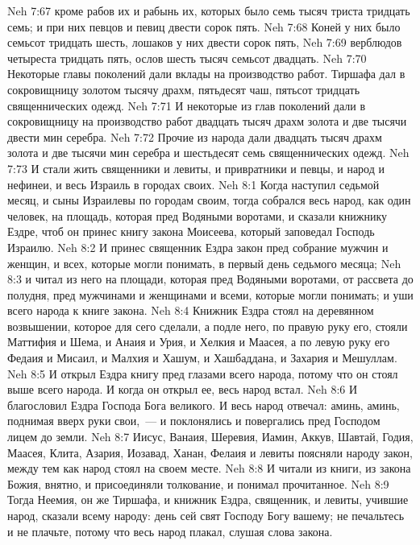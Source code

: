 \vs Neh 7:67 кроме рабов их и рабынь их, которых было семь тысяч триста тридцать семь; и при них певцов и певиц двести сорок пять.
\vs Neh 7:68 Коней у них было семьсот тридцать шесть, лошаков у них двести сорок пять,
\vs Neh 7:69 верблюдов четыреста тридцать пять, ослов шесть тысяч семьсот двадцать.
\vs Neh 7:70 Некоторые главы поколений дали вклады на производство работ. Тиршафа дал в сокровищницу золотом тысячу драхм, пятьдесят чаш, пятьсот тридцать священнических одежд.
\vs Neh 7:71 И некоторые из глав поколений дали в сокровищницу на производство работ двадцать тысяч драхм золота и две тысячи двести мин серебра.
\vs Neh 7:72 Прочие из народа дали двадцать тысяч драхм золота и две тысячи мин серебра и шестьдесят семь священнических одежд.
\vs Neh 7:73 И стали жить священники и левиты, и привратники и певцы, и народ и нефинеи, и весь Израиль в городах своих.
\vs Neh 8:1 Когда наступил седьмой месяц, и сыны Израилевы  по городам своим, тогда собрался весь народ, как один человек, на площадь, которая пред Водяными воротами, и сказали книжнику Ездре, чтоб он принес книгу закона Моисеева, который заповедал Господь Израилю.
\vs Neh 8:2 И принес священник Ездра закон пред собрание мужчин и женщин, и всех, которые могли понимать, в первый день седьмого месяца;
\vs Neh 8:3 и читал из него на площади, которая пред Водяными воротами, от рассвета до полудня, пред мужчинами и женщинами и всеми, которые могли понимать; и уши всего народа  к книге закона.
\vs Neh 8:4 Книжник Ездра стоял на деревянном возвышении, которое для сего сделали, а подле него, по правую руку его, стояли Маттифия и Шема, и Анаия и Урия, и Хелкия и Маасея, а по левую руку его Федаия и Мисаил, и Малхия и Хашум, и Хашбаддана, и Захария и Мешуллам.
\vs Neh 8:5 И открыл Ездра книгу пред глазами всего народа, потому что он стоял выше всего народа. И когда он открыл ее, весь народ встал.
\vs Neh 8:6 И благословил Ездра Господа Бога великого. И весь народ отвечал: аминь, аминь, поднимая вверх руки свои,~--- и поклонялись и повергались пред Господом лицем до земли.
\vs Neh 8:7 Иисус, Ванаия, Шеревия, Иамин, Аккув, Шавтай, Годия, Маасея, Клита, Азария, Иозавад, Ханан, Фелаия и левиты поясняли народу закон, между тем как народ стоял на своем месте.
\vs Neh 8:8 И читали из книги, из закона Божия, внятно, и присоединяли толкование, и  понимал прочитанное.
\rsbpar\vs Neh 8:9 Тогда Неемия, он же Тиршафа, и книжник Ездра, священник, и левиты, учившие народ, сказали всему народу: день сей свят Господу Богу вашему; не печальтесь и не плачьте, потому что весь народ плакал, слушая слова закона.
